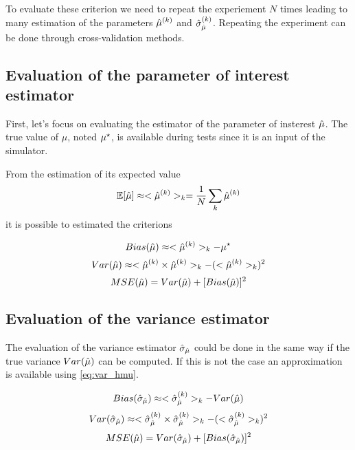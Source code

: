 To evaluate these criterion we need to repeat the experiement $N$ times leading to many estimation of the parameters $\hat\mu^{(k)}$ and $\hat\sigma_{\hat\mu}^{(k)}$.
Repeating the experiment can be done through cross-validation methods.


\subsection{Evaluation of the parameter of interest estimator} %
\label{sub:evaluation_of_the_parameter_of_interest_estimator}

First, let's focus on evaluating the estimator of the parameter of insterest $\hat\mu$.
The true value of $\mu$, noted $\mu^\star$, is available during tests since it is an input of the simulator.

From the estimation of its expected value
\begin{equation}
	\mathbb{E}[\hat\mu] \approx <\hat\mu^{(k)}>_k = \frac{1}{N} \sum_{k} \hat\mu^{(k)}
\end{equation}
it is possible to estimated the criterions

\begin{equation}
	Bias(\hat\mu) \approx <\hat\mu^{(k)}>_k - \mu^\star
\end{equation}
\begin{equation}
	\label{eq:var_hmu}
	Var(\hat\mu) \approx <\hat\mu^{(k)} \times \hat\mu^{(k)}>_k - (<\hat\mu^{(k)}>_k)^2
\end{equation}
\begin{equation}
	MSE(\hat\mu) = Var(\hat\mu) + [Bias(\hat\mu)]^2
\end{equation}

\subsection{Evaluation of the variance estimator} %
\label{sub:evaluation_of_the_variance_estimator}

The evaluation of the variance estimator $\hat\sigma_{\hat\mu}$ could be done in the same way if the true variance $Var(\hat\mu)$ can be computed.
If this is not the case an approximation is available using \autoref{eq:var_hmu}.

\begin{equation}
	Bias(\hat\sigma_{\hat\mu}) \approx <\hat\sigma_{\hat\mu}^{(k)}>_k - Var(\hat\mu)
\end{equation}
\begin{equation}
	Var(\hat\sigma_{\hat\mu}) \approx <\hat\sigma_{\hat\mu}^{(k)} \times \hat\sigma_{\hat\mu}^{(k)}>_k - (<\hat\sigma_{\hat\mu}^{(k)}>_k)^2
\end{equation}
\begin{equation}
	MSE(\hat\mu) = Var(\hat\sigma_{\hat\mu}) + [Bias(\hat\sigma_{\hat\mu})]^2
\end{equation}


